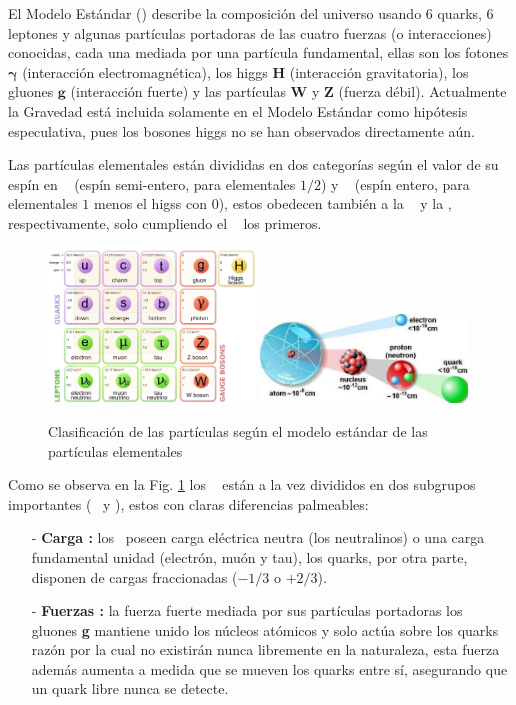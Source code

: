 El Modelo Estándar (\ME) describe la composición del universo usando 6 quarks, 6 leptones y algunas partículas portadoras de las cuatro  fuerzas (o interacciones) conocidas, cada una mediada por una partícula fundamental, ellas son los fotones $\mathbf{\gamma}$ (interacción electromagnética), los higgs $\mathbf{H}$ (interacción gravitatoria), los gluones $\mathbf{g}$ (interacción fuerte) y las partículas $\mathbf{W}$ y $\mathbf{Z}$ (fuerza débil). Actualmente la Gravedad está incluida solamente en el Modelo Estándar como hipótesis especulativa, pues los bosones higgs no se han observados directamente aún.

Las partículas elementales están divididas en dos categorías según el valor de su espín en \fermiones ~ (espín semi-entero, para elementales $1/2$) y \bosones ~ (espín entero, para elementales $1$ menos el higss con $0$), estos obedecen también a la \fermidirac ~ y la \boseeinstein, respectivamente, solo cumpliendo el \pauli ~ los primeros.

\begin{figure}
    \centering
    \includegraphics[width=0.49\textwidth]{Fisica_de_Particulas/imagenes/standard_model.png}
    \includegraphics[width=0.49\textwidth]{Fisica_de_Particulas/imagenes/atom.jpg}
    \caption{Clasificación de las partículas según el modelo estándar de las partículas elementales}
    \label{estandar}
\end{figure}

Como se observa en la Fig. \ref{estandar} los \fermiones ~ est\'an a la vez divididos en dos subgrupos importantes (\quarks ~ y \leptones), estos con claras diferencias palmeables:
\begin{itemize}
\item[-] \textbf{Carga :} los \leptones ~poseen carga eléctrica neutra (los neutralinos) o una carga fundamental unidad (electrón, muón y tau), los quarks, por otra parte, disponen de cargas fraccionadas ($- 1/3$ o $+ 2/3$). 
\item[-] \textbf{Fuerzas :} la fuerza fuerte mediada por sus partículas portadoras los gluones \textbf{g} mantiene unido los núcleos atómicos y solo act\'ua sobre los quarks raz\'on por la cual no existirán nunca libremente en la naturaleza, esta fuerza adem\'as aumenta a medida que se mueven los quarks entre sí, asegurando que un quark libre nunca se detecte. 
\end{itemize}


